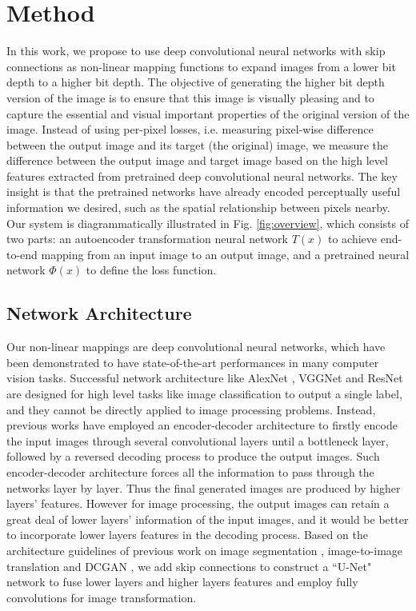 \documentclass[journal]{IEEEtran}
\begin{document}
\section{Method}
In this work, we propose to use deep convolutional neural networks with skip connections as non-linear mapping functions to expand images from a lower bit depth to a higher bit depth. The objective of generating the higher bit depth version of the image is to ensure that this image is visually pleasing and to capture the essential and visual important properties of the original version of the image. Instead of using per-pixel losses, i.e. measuring pixel-wise difference between the output image and its target (the original) image, we measure the difference between the output image and target image based on the high level features extracted from pretrained deep convolutional neural networks. The key insight is that the pretrained networks have already encoded perceptually useful information we desired, such as the spatial relationship between pixels nearby. Our system is diagrammatically illustrated in Fig. \ref{fig:overview}, which consists of two parts: an autoencoder transformation neural network $T(x)$ to achieve end-to-end mapping from an input image to an output image, and a pretrained neural network $\Phi(x)$ to define the loss function.



\subsection{Network Architecture}
Our non-linear mappings are deep convolutional neural networks, which have been demonstrated to have state-of-the-art performances in many computer vision tasks. Successful network architecture like AlexNet \cite{krizhevsky2012imagenet}, VGGNet \cite{simonyan2014very} and ResNet \cite{he2016deep} are designed for high level tasks like image classification to output a single label, and they cannot be directly applied to image processing problems. Instead, previous works have employed an encoder-decoder architecture \cite{hou2017deep,johnson2016perceptual} to firstly encode the input images through several convolutional layers until a bottleneck layer, followed by a reversed decoding process to produce the output images. Such encoder-decoder architecture forces all the information to pass through the networks layer by layer. Thus the final generated images are produced by higher layers' features. However for image processing, the output images can retain a great deal of lower layers' information of the input images, and it would be better to incorporate lower layers features in the decoding process. Based on the architecture guidelines of previous work on image segmentation \cite{ronneberger2015u}, image-to-image translation \cite{isola2016image} and DCGAN \cite{radford2015unsupervised}, we add skip connections to construct a ``U-Net" network to fuse lower layers and higher layers features and employ fully convolutions for image transformation.
\end{document}
